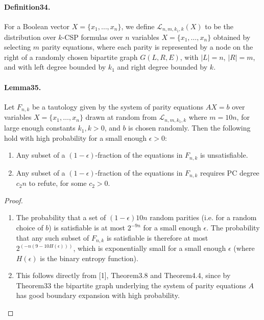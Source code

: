\documentclass[10pt,a4paper]{article}
\begin{document}
\paragraph{Definition34.} For a Boolean vector $X=\{x_1,\ldots,x_n\}$, we define $\mathcal L_{n,m,k_1,k}(X)$ to be the distribution over $k$-CSP formulas over $n$ variables $X=\{x_1,\ldots,x_n\}$ obtained by selecting $m$ parity equations, where each parity is represented by a node on the right of a randomly chosen bipartite graph $G(L,R,E)$, with $|L|=n$, $|R|=m$, and with left degree bounded by $k_1$ and right degree bounded by $k$.
\paragraph{Lemma35.} Let $F_{n,k}$ be a tautology given by the system of parity equations $AX=b$ over variables $X=\{x_1,\ldots,x_n\}$ drawn at random from $\mathcal L_{n,m,k_1,k}$ where $m=10n$, for large enough constants $k_1,k>0$, and $b$ is chosen randomly. Then the following hold with high probability for a small enough $\epsilon>0$:
\begin{enumerate}[label=\alph*)]
\item Any subset of a $(1-\epsilon)$-fraction of the equations in $F_{n,k}$ is unsatisfiable.
\item Any subset of a $(1-\epsilon)$-fraction of the equations in $F_{n,k}$ requires PC degree $c_2n$ to refute, for some $c_2>0$.
\end{enumerate}
\begin{proof}
\begin{enumerate}[label=\alph*)]
\item The probability that a set of $(1-\epsilon)10n$ random parities (i.e. for a random choice of $b$) is satisfiable is at most $2^{-9n}$ for a small enough $\epsilon$. The probability that any such subset of $F_{n,k}$ is satisfiable is therefore at most $2^{(-n(9-10H(\epsilon)))}$, which is exponentially small for a small enough $\epsilon$ (where $H(\epsilon)$ is the binary entropy function).
\item This follows directly from [1], Theorem3.8 and Theorem4.4, since by Theorem33 the bipartite graph underlying the system of parity equations $A$ has good boundary expansion with high probability.
\end{enumerate}
\end{proof}
\end{document}
